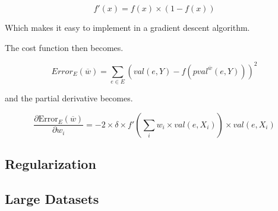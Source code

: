 $$f'(x) = f(x) \times (1-f(x))$$

Which makes it easy to implement in a gradient descent algorithm.

The cost function then becomes.

$$Error_E(\overline{w}) = \sum_{e \in E} (val(e,Y)-f(pval^{\overline{w}}(e,Y)))^2$$ 

and the partial derivative becomes.

$$\frac{\partial \text{Error}_E(\overline{w})}{\partial w_i} 
	= -2 \times \delta \times f'(\sum_i w_i \times val(e,X_i)) \times val(e,X_i)$$



\begin{flushright}
\cite[p. 306-307]{AI2010}
\end{flushright}


\subsection{Regularization}


\subsection{Large Datasets}












